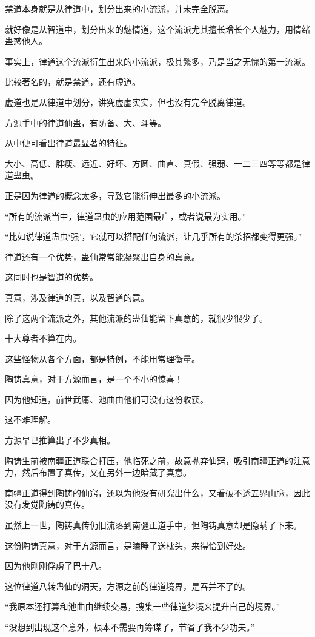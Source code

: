 \begin{this_body}
禁道本身就是从律道中，划分出来的小流派，并未完全脱离。

就好像是从智道中，划分出来的魅情道，这个流派尤其擅长增长个人魅力，用情绪蛊惑他人。

事实上，律道这个流派衍生出来的小流派，极其繁多，乃是当之无愧的第一流派。

比较著名的，就是禁道，还有虚道。

虚道也是从律道中划分，讲究虚虚实实，但也没有完全脱离律道。

方源手中的律道仙蛊，有防备、大、斗等。

从中便可看出律道最显著的特征。

大小、高低、胖瘦、远近、好坏、方圆、曲直、真假、强弱、一二三四等等都是律道蛊虫。

正是因为律道的概念太多，导致它能衍伸出最多的小流派。

“所有的流派当中，律道蛊虫的应用范围最广，或者说最为实用。”

“比如说律道蛊虫‘强’，它就可以搭配任何流派，让几乎所有的杀招都变得更强。”

律道还有一个优势，蛊仙常常能凝聚出自身的真意。

这同时也是智道的优势。

真意，涉及律道的真，以及智道的意。

除了这两个流派之外，其他流派的蛊仙能留下真意的，就很少很少了。

十大尊者不算在内。

这些怪物从各个方面，都是特例，不能用常理衡量。

陶铸真意，对于方源而言，是一个不小的惊喜！

因为他知道，前世武庸、池曲由他们可没有这份收获。

这不难理解。

方源早已推算出了不少真相。

陶铸生前被南疆正道联合打压，他临死之前，故意抛弃仙窍，吸引南疆正道的注意力，然后布置了真传，又在另外一边暗藏了真意。

南疆正道得到陶铸的仙窍，还以为他没有研究出什么，又看破不透五界山脉，因此没有发觉陶铸的真传。

虽然上一世，陶铸真传仍旧流落到南疆正道手中，但陶铸真意却是隐瞒了下来。

这份陶铸真意，对于方源而言，是瞌睡了送枕头，来得恰到好处。

因为他刚刚俘虏了巴十八。

这位律道八转蛊仙的洞天，方源之前的律道境界，是吞并不了的。

“我原本还打算和池曲由继续交易，搜集一些律道梦境来提升自己的境界。”

“没想到出现这个意外，根本不需要再筹谋了，节省了我不少功夫。”

\end{this_body}

